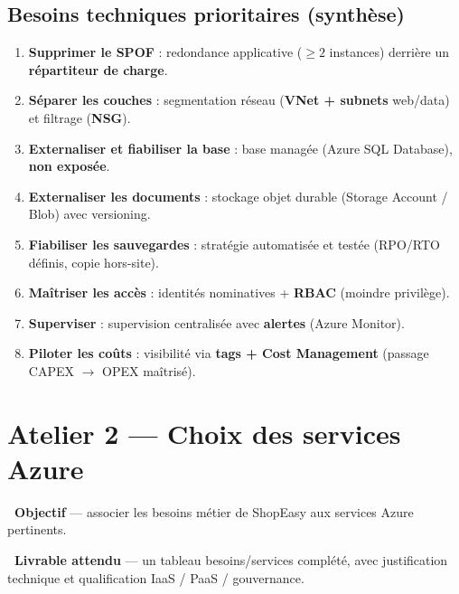 \documentclass[11pt,a4paper]{article}
\newcommand{\emo}[1]{\raisebox{-0.14em}{\twemoji{#1}}}
\newcommand{\eTarget}{\emo{1f3af}}
\newcommand{\ePackage}{\emo{1f4e6}}
\newcommand{\arr}{\ensuremath{\rightarrow}}
\begin{document}
\subsection{Besoins techniques prioritaires (synthèse)}
\begin{enumerate}
  \item \textbf{Supprimer le SPOF} : redondance applicative ($\geq 2$ instances) derrière un \textbf{répartiteur de charge}.
  \item \textbf{Séparer les couches} : segmentation réseau (\textbf{VNet + subnets} web/data) et filtrage (\textbf{NSG}).
  \item \textbf{Externaliser et fiabiliser la base} : base managée (Azure SQL Database), \textbf{non exposée}.
  \item \textbf{Externaliser les documents} : stockage objet durable (Storage Account / Blob) avec versioning.
  \item \textbf{Fiabiliser les sauvegardes} : stratégie automatisée et testée (RPO/RTO définis, copie hors-site).
  \item \textbf{Maîtriser les accès} : identités nominatives + \textbf{RBAC} (moindre privilège).
  \item \textbf{Superviser} : supervision centralisée avec \textbf{alertes} (Azure Monitor).
  \item \textbf{Piloter les coûts} : visibilité via \textbf{tags + Cost Management} (passage CAPEX \arr{} OPEX maîtrisé).
\end{enumerate}


\section{Atelier 2 — Choix des services Azure}

\begin{fiche}
\textbf{\eTarget~Objectif} — associer les besoins métier de ShopEasy aux services Azure pertinents.

\textbf{\ePackage~Livrable attendu} — un tableau besoins/services complété, avec justification technique et qualification IaaS / PaaS / gouvernance.
\end{fiche}
\end{document}
